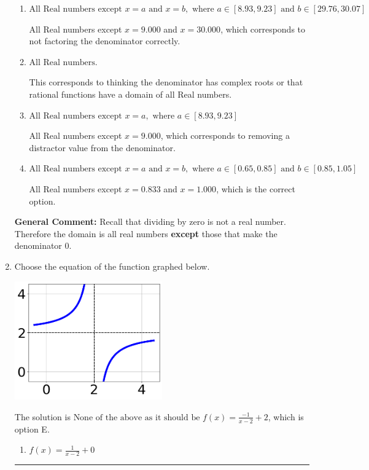 \documentclass{extbook}[14pt]
\newcommand{\litem}[1]{\item #1

\rule{\textwidth}{0.4pt}}
\begin{document}
\begin{enumerate}
{\begin{enumerate}[label=\Alph*.]
All Real numbers except $x = 0.833$, which corresponds to removing only 1 value from the denominator.
\item \( \text{All Real numbers except } x = a \text{ and } x = b, \text{ where } a \in [8.93, 9.23] \text{ and } b \in [29.76, 30.07] \)

All Real numbers except $x = 9.000$ and $x = 30.000$, which corresponds to not factoring the denominator correctly.
\item \( \text{All Real numbers.} \)

This corresponds to thinking the denominator has complex roots or that rational functions have a domain of all Real numbers.
\item \( \text{All Real numbers except } x = a, \text{ where } a \in [8.93, 9.23] \)

All Real numbers except $x = 9.000$, which corresponds to removing a distractor value from the denominator.
\item \( \text{All Real numbers except } x = a \text{ and } x = b, \text{ where } a \in [0.65, 0.85] \text{ and } b \in [0.85, 1.05] \)

All Real numbers except $x = 0.833$ and $x = 1.000$, which is the correct option.
\end{enumerate}

\textbf{General Comment:} Recall that dividing by zero is not a real number. Therefore the domain is all real numbers \textbf{except} those that make the denominator 0.
}
\litem{
Choose the equation of the function graphed below.

\begin{center}
    \includegraphics[width=0.5\textwidth]{../Figures/rationalGraphToEquationB.png}
\end{center}


The solution is \( \text{None of the above as it should be } f(x) = \frac{-1}{x - 2} + 2 \), which is option E.\begin{enumerate}[label=\Alph*.]
\item \( f(x) = \frac{1}{x - 2} + 0 \)


\end{enumerate}}
\end{enumerate}
\end{document}
